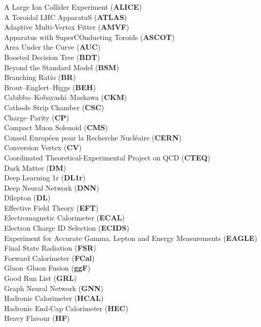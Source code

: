 A Large Ion Collider Experiment (\textbf{ALICE}) \\
A Toroidal LHC ApparatuS (\textbf{ATLAS}) \\
Adaptive Multi-Vertex Fitter (\textbf{AMVF}) \\
Apparatus with SuperCOnducting Toroids (\textbf{ASCOT}) \\
Area Under the Curve (\textbf{AUC}) \\
Boosted Decision Tree (\textbf{BDT}) \\
Beyond the Standard Model (\textbf{BSM}) \\
Branching Ratio (\textbf{BR}) \\
Brout–Englert–Higgs (\textbf{BEH}) \\
Cabibbo–Kobayashi–Maskawa (\textbf{CKM}) \\
Cathode Strip Chamber (\textbf{CSC}) \\
Charge–Parity (\textbf{CP}) \\
Compact Muon Solenoid (\textbf{CMS}) \\
Conseil Européen pour la Recherche Nucléaire (\textbf{CERN}) \\
Conversion Vertex (\textbf{CV}) \\
Coordinated Theoretical-Experimental Project on QCD (\textbf{CTEQ}) \\
Dark Matter (\textbf{DM}) \\
Deep Learning 1r (\textbf{DL1r}) \\
Deep Neural Network (\textbf{DNN}) \\
Dilepton (\textbf{DL}) \\
Effective Field Theory (\textbf{EFT}) \\
Electromagnetic Calorimeter (\textbf{ECAL}) \\
Electron Charge ID Selection (\textbf{ECIDS}) \\
Experiment for Accurate Gamma, Lepton and Energy Measurements (\textbf{EAGLE}) \\
Final State Radiation (\textbf{FSR}) \\
Forward Calorimeter (\textbf{FCal}) \\
Gluon–Gluon Fusion (\textbf{ggF}) \\
Good Run List (\textbf{GRL}) \\
Graph Neural Network (\textbf{GNN}) \\
Hadronic Calorimeter (\textbf{HCAL}) \\
Hadronic End-Cap Calorimeter (\textbf{HEC}) \\
Heavy Flavour (\textbf{HF}) \\
